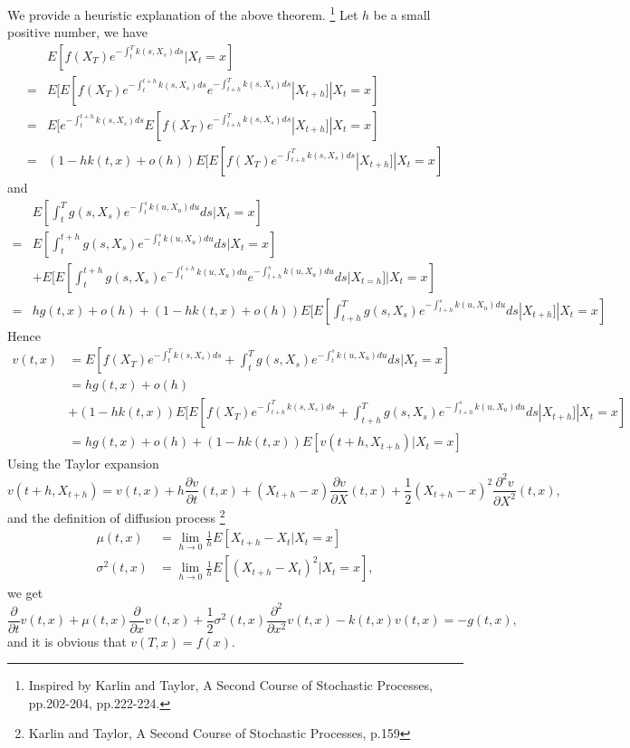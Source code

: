 \begin{remark}
We provide a heuristic explanation of the above theorem.
\footnote{Inspired by Karlin and Taylor, A Second Course of Stochastic 
  Processes, pp.202-204, pp.222-224.}
Let $h$ be a small positive number, we have
\begin{align*}
  &E\left[ f(X_T) e^{-\int_t^T k(s,X_s) ds}  \bigg| X_t=x \right] \\
  =& E[ E[ f(X_T) e^{-\int_t^{t+h} k(s,X_s) ds} e^{-\int_{t+h}^T k(s,X_s) ds}  
     | X_{t+h} ] | X_t=x ] \\
  =& E[ e^{-\int_t^{t+h} k(s,X_s) ds}  E[ f(X_T) e^{-\int_{t+h}^T k(s,X_s) ds}  
     | X_{t+h} ] | X_t=x ]   \\
  =& (1-h k(t,x) + o(h)) 
     E[ E[ f(X_T) e^{-\int_{t+h}^T k(s,X_s) ds} | X_{t+h} ] | X_t=x ] 
\end{align*}
and
\begin{align*}
  &E\left[ \int_t^T g(s,X_s) e^{-\int_t^s k(u,X_u)du} ds \bigg| X_t=x \right] \\
  =&E[ \int_t^{t+h} g(s,X_s) e^{-\int_t^s k(u,X_u)du} ds | X_t=x ] \\
   &+ E[ E[ \int_t^{t+h} g(s,X_s) e^{-\int_t^{t+h} k(u,X_u)du} 
            e^{-\int_{t+h}^s k(u,X_u)du} ds | X_{t=h} ] | X_t=x ] \\
  =& h g(t,x) + o(h)     
   + (1-h k(t,x) + o(h)) 
     E[ E[ \int_{t+h}^T g(s,X_s) e^{-\int_{t+h}^s k(u,X_u)du} ds | X_{t+h} ] | X_t=x ] 
\end{align*}
Hence
\begin{align*}
  v(t,x) 
   &= E\left[ f(X_T) e^{-\int_t^T k(s,X_s) ds}  
              + \int_t^T g(s,X_s) e^{-\int_t^s k(u,X_u) du} ds \bigg| X_t = x
       \right]   \\
   &= h g(t,x) + o(h) \\
   &+ (1-h k(t,x)) 
     E[ E[ f(X_T) e^{-\int_{t+h}^T k(s,X_s) ds} 
      + \int_{t+h}^T g(s,X_s) e^{-\int_{t+h}^s k(u,X_u)du} ds 
     | X_{t+h} ] | X_t=x ]   \\
   &= h g(t,x) + o(h) + (1- h k(t,x)) E[ v(t+h, X_{t+h}) | X_t=x ] 
\end{align*}
Using the Taylor expansion
\[
  v(t+h,X_{t+h}) = v(t,x) + h \frac{\partial v}{\partial t}(t,x)
         + (X_{t+h}-x) \frac{\partial v}{\partial X}(t,x)
         + \frac{1}{2} (X_{t+h}-x)^2 \frac{\partial^2 v}{\partial X^2}(t,x),
\]
and the definition of diffusion process 
\footnote{Karlin and Taylor, A Second Course of Stochastic Processes, p.159 }
\begin{align*}
  \mu(t,x)    &= \lim_{h\to 0} \frac{1}{h} E[X_{t+h}-X_t | X_t=x]  \\
  \sigma^2(t,x) &= \lim_{h\to 0} \frac{1}{h} E[(X_{t+h}-X_t)^2 | X_t=x],
\end{align*}
we get
\[
  \frac{\partial}{\partial t} v(t,x) 
  + \mu(t,x) \frac{\partial}{\partial x} v(t,x) 
  + \frac{1}{2} \sigma^2(t,x) \frac{\partial^2}{\partial x^2} v(t,x) 
  - k(t,x) v(t,x) = -g(t,x), 
\]
and it is obvious that $v(T,x)=f(x)$.
\end{remark}


